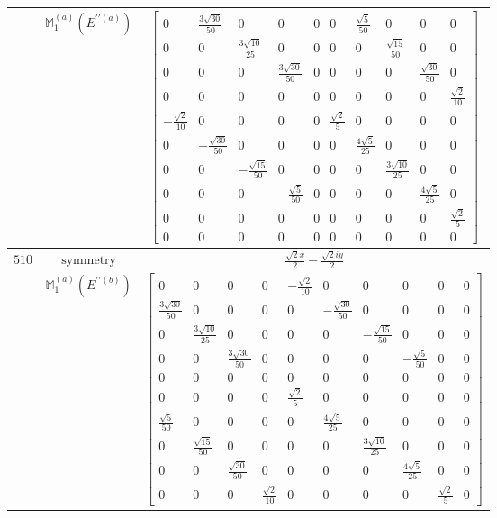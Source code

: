 \documentclass[fleqn,8pt,landscape]{jsarticle}
\begin{document}
\begin{longtable}{ccc}
$  $ & $ \mathbb{M}_{1}^{(a)}(E^{\prime\prime(a)}) $ & $ \begin{bmatrix} 0 & \frac{3 \sqrt{30}}{50} & 0 & 0 & 0 & 0 & \frac{\sqrt{5}}{50} & 0 & 0 & 0 \\ 0 & 0 & \frac{3 \sqrt{10}}{25} & 0 & 0 & 0 & 0 & \frac{\sqrt{15}}{50} & 0 & 0 \\ 0 & 0 & 0 & \frac{3 \sqrt{30}}{50} & 0 & 0 & 0 & 0 & \frac{\sqrt{30}}{50} & 0 \\ 0 & 0 & 0 & 0 & 0 & 0 & 0 & 0 & 0 & \frac{\sqrt{2}}{10} \\ - \frac{\sqrt{2}}{10} & 0 & 0 & 0 & 0 & \frac{\sqrt{2}}{5} & 0 & 0 & 0 & 0 \\ 0 & - \frac{\sqrt{30}}{50} & 0 & 0 & 0 & 0 & \frac{4 \sqrt{5}}{25} & 0 & 0 & 0 \\ 0 & 0 & - \frac{\sqrt{15}}{50} & 0 & 0 & 0 & 0 & \frac{3 \sqrt{10}}{25} & 0 & 0 \\ 0 & 0 & 0 & - \frac{\sqrt{5}}{50} & 0 & 0 & 0 & 0 & \frac{4 \sqrt{5}}{25} & 0 \\ 0 & 0 & 0 & 0 & 0 & 0 & 0 & 0 & 0 & \frac{\sqrt{2}}{5} \\ 0 & 0 & 0 & 0 & 0 & 0 & 0 & 0 & 0 & 0 \end{bmatrix} $ \\ \hline
$ 510 $ & $ \text{symmetry} $ & $ \frac{\sqrt{2} x}{2} - \frac{\sqrt{2} i y}{2} $ \\
$  $ & $ \mathbb{M}_{1}^{(a)}(E^{\prime\prime(b)}) $ & $ \begin{bmatrix} 0 & 0 & 0 & 0 & - \frac{\sqrt{2}}{10} & 0 & 0 & 0 & 0 & 0 \\ \frac{3 \sqrt{30}}{50} & 0 & 0 & 0 & 0 & - \frac{\sqrt{30}}{50} & 0 & 0 & 0 & 0 \\ 0 & \frac{3 \sqrt{10}}{25} & 0 & 0 & 0 & 0 & - \frac{\sqrt{15}}{50} & 0 & 0 & 0 \\ 0 & 0 & \frac{3 \sqrt{30}}{50} & 0 & 0 & 0 & 0 & - \frac{\sqrt{5}}{50} & 0 & 0 \\ 0 & 0 & 0 & 0 & 0 & 0 & 0 & 0 & 0 & 0 \\ 0 & 0 & 0 & 0 & \frac{\sqrt{2}}{5} & 0 & 0 & 0 & 0 & 0 \\ \frac{\sqrt{5}}{50} & 0 & 0 & 0 & 0 & \frac{4 \sqrt{5}}{25} & 0 & 0 & 0 & 0 \\ 0 & \frac{\sqrt{15}}{50} & 0 & 0 & 0 & 0 & \frac{3 \sqrt{10}}{25} & 0 & 0 & 0 \\ 0 & 0 & \frac{\sqrt{30}}{50} & 0 & 0 & 0 & 0 & \frac{4 \sqrt{5}}{25} & 0 & 0 \\ 0 & 0 & 0 & \frac{\sqrt{2}}{10} & 0 & 0 & 0 & 0 & \frac{\sqrt{2}}{5} & 0 \end{bmatrix} $ \\ \hline

\end{longtable}
\end{document}
